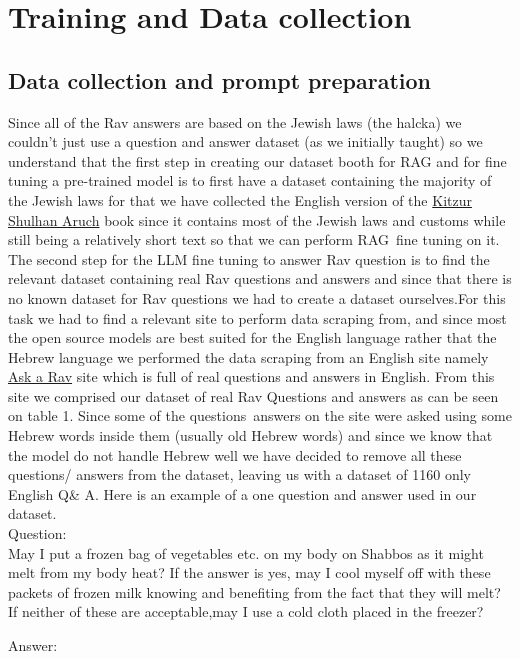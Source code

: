 \documentclass[11pt]{article}
\begin{document}
\section{Training and Data collection}
\subsection{Data collection and prompt preparation}
Since all of the Rav answers are based on the Jewish laws (the halcka) we couldn't just use a question and answer dataset (as we initially taught) so we understand that the first step in creating our dataset booth for RAG and for fine tuning a pre-trained model is to  first have a dataset containing the majority of the Jewish laws for that we have collected the English version of the \href{https://pdfcoffee.com/kitzur-shulchan-aruch-pdf-free.html}{ Kitzur Shulhan Aruch} book since it contains most of the Jewish laws and customs while still being a relatively short text so that we can perform RAG\ fine tuning on it.
The second step for the LLM fine tuning to answer Rav question is to find the relevant dataset containing real Rav questions and answers  and since that there is no known dataset for Rav questions we had to create a dataset ourselves.For this task we had to find a relevant site to perform data scraping from, and since most the open source models are best suited for the English language rather that the Hebrew language we performed the data scraping from an English site namely \href{https://asktherav.com/ }{Ask a Rav} site which is full of real questions and answers in English. From this site we comprised our dataset of real Rav Questions and answers as can be seen on table 1.
Since some of the questions\ answers on the site were asked using some Hebrew words inside them (usually old Hebrew words) and since we know that the model do not handle Hebrew well we have decided to remove all these questions/ answers from the dataset, leaving us with a dataset of 1160 only English Q\& A.
Here is an example of a one question and answer used in our dataset.\\
Question:\\
 May I put a frozen bag of vegetables etc. on my body on Shabbos as it might melt from my body heat?
If the answer is yes, may I cool myself off with these packets of frozen milk knowing and benefiting from the fact that they will melt? If neither of these are acceptable,may I use a cold cloth placed in the freezer?

Answer:\\
\end{document}
